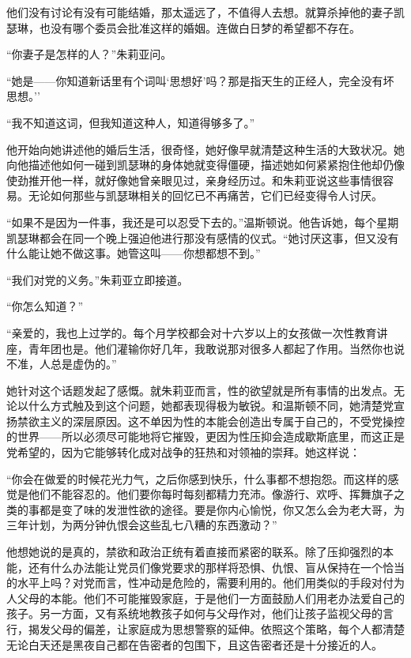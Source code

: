 他们没有讨论有没有可能结婚，那太遥远了，不值得人去想。就算杀掉他的妻子凯瑟琳，也没有哪个委员会批准这样的婚姻。连做白日梦的希望都不存在。

``你妻子是怎样的人？''朱莉亚问。

``她是------你知道新话里有个词叫`思想好'吗？那是指天生的正经人，完全没有坏思想。''

``我不知道这词，但我知道这种人，知道得够多了。''

他开始向她讲述他的婚后生活，很奇怪，她好像早就清楚这种生活的大致状况。她向他描述他如何一碰到凯瑟琳的身体她就变得僵硬，描述她如何紧紧抱住他却仍像使劲推开他一样，就好像她曾亲眼见过，亲身经历过。和朱莉亚说这些事情很容易。无论如何那些与凯瑟琳相关的回忆已不再痛苦，它们已经变得令人讨厌。

``如果不是因为一件事，我还是可以忍受下去的。''温斯顿说。他告诉她，每个星期凯瑟琳都会在同一个晚上强迫他进行那没有感情的仪式。``她讨厌这事，但又没有什么能让她不做这事。她管这叫------你想都想不到。''

``我们对党的义务。''朱莉亚立即接道。

``你怎么知道？''

``亲爱的，我也上过学的。每个月学校都会对十六岁以上的女孩做一次性教育讲座，青年团也是。他们灌输你好几年，我敢说那对很多人都起了作用。当然你也说不准，人总是虚伪的。''

她针对这个话题发起了感慨。就朱莉亚而言，性的欲望就是所有事情的出发点。无论以什么方式触及到这个问题，她都表现得极为敏锐。和温斯顿不同，她清楚党宣扬禁欲主义的深层原因。这不单因为性的本能会创造出专属于自己的，不受党操控的世界------所以必须尽可能地将它摧毁，更因为性压抑会造成歇斯底里，而这正是党希望的，因为它能够转化成对战争的狂热和对领袖的崇拜。她这样说：

``你会在做爱的时候花光力气，之后你感到快乐，什么事都不想抱怨。而这样的感觉是他们不能容忍的。他们要你每时每刻都精力充沛。像游行、欢呼、挥舞旗子之类的事都是变了味的发泄性欲的途径。要是你内心愉悦，你又怎么会为老大哥，为三年计划，为两分钟仇恨会这些乱七八糟的东西激动？''

他想她说的是真的，禁欲和政治正统有着直接而紧密的联系。除了压抑强烈的本能，还有什么办法能让党员们像党要求的那样将恐惧、仇恨、盲从保持在一个恰当的水平上吗？对党而言，性冲动是危险的，需要利用的。他们用类似的手段对付为人父母的本能。他们不可能摧毁家庭，于是他们一方面鼓励人们用老办法爱自己的孩子。另一方面，又有系统地教孩子如何与父母作对，他们让孩子监视父母的言行，揭发父母的偏差，让家庭成为思想警察的延伸。依照这个策略，每个人都清楚无论白天还是黑夜自己都在告密者的包围下，且这告密者还是十分接近的人。


